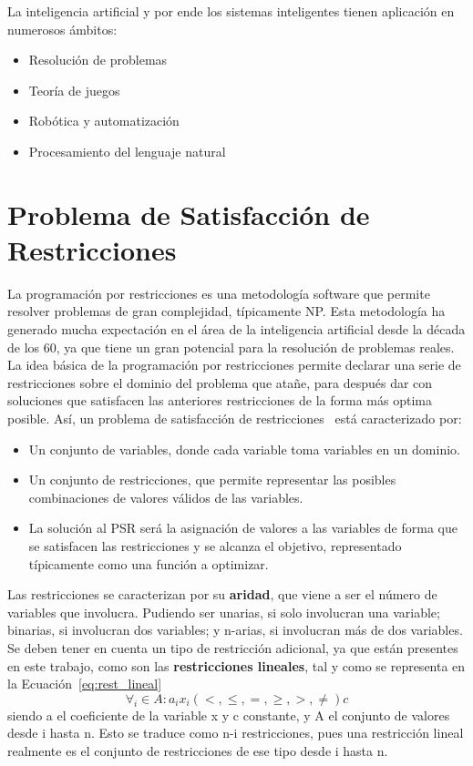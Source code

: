 La inteligencia artificial y por ende los sistemas inteligentes tienen aplicación en numerosos ámbitos:
\begin{itemize}
\item{Resolución de problemas}
\item{Teoría de juegos}
\item{Robótica y automatización}
\item{Procesamiento del lenguaje natural}
\end{itemize}

\section{Problema de Satisfacción de Restricciones}
La programación por restricciones es una metodología software que permite resolver problemas de gran complejidad, típicamente NP. Esta metodología ha generado mucha expectación en el área de la inteligencia artificial desde la década de los 60, ya que tiene un gran potencial para la resolución de problemas reales. La idea básica de la programación por restricciones permite declarar una serie de restricciones sobre el dominio del problema que atañe, para después dar con soluciones que satisfacen las anteriores restricciones de la forma más optima posible. Así, un problema de satisfacción de restricciones~\cite{Russ06} está caracterizado por:
\begin{itemize}
	\item Un conjunto de variables, donde cada variable toma variables en un dominio.
	\item Un conjunto de restricciones, que permite representar las posibles combinaciones de valores válidos de las variables.
	\item La solución al \gls{PSR} será la asignación de valores a las variables de forma que se satisfacen las restricciones y se alcanza el objetivo, representado típicamente como una función a optimizar.
\end{itemize}
Las restricciones se caracterizan por su \textbf{aridad}, que viene a ser el número de variables que involucra. Pudiendo ser unarias, si solo involucran una variable; binarias, si involucran dos variables; y n-arias, si involucran más de dos variables. Se deben tener en cuenta un tipo de restricción adicional, ya que están presentes en este trabajo, como son las \textbf{restricciones lineales}, tal y como se representa en la Ecuación~\ref{eq:rest_lineal}
\begin{equation}
  \label{eq:rest_lineal}
  \forall_{i} \in A :  a_{i}x_{i} (<,\leq,=,\geq,>,\neq) c
\end{equation}
siendo a el coeficiente de la variable x y c constante, y A el conjunto de valores desde i hasta n. Esto se traduce como n-i restricciones, pues una restricción lineal realmente es el conjunto de restricciones de ese tipo desde i hasta n.\\
